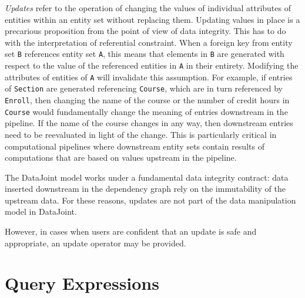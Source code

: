 \documentclass[letter,10pt]{article}
\newcommand{\datajoint}{DataJoint\xspace}
\begin{document}
\emph{Updates} refer to the operation of changing the values of individual attributes of entities within an entity set without replacing them.
Updating values in place is a precarious proposition from the point of view of data integrity. 
This has to do with the interpretation of referential constraint.  
When a foreign key from entity set \lstinline{B} references entity set \lstinline{A}, this means that elements in \lstinline{B} are generated with respect to the value of the referenced entities in \lstinline{A} in their entirety.  
Modifying the attributes of entities of \lstinline{A} will invalidate this assumption.
For example, if entries of \lstinline{Section} are generated referencing \lstinline{Course}, which are in turn referenced by \lstinline{Enroll}, then changing the name of the course or the number of credit hours in \lstinline{Course} would fundamentally change the meaning of entries downstream in the pipeline.  
If the name of the course changes in any way, then downstream entries need to be reevaluated in light of the change.
This is particularly critical in computational pipelines where downstream entity sets contain results of computations that are based on values upstream in the pipeline.  

The \datajoint model works under a fundamental data integrity contract: data inserted downstream in the dependency graph rely on the immutability of the upstream data. 
For these reasons, updates are not part of the data manipulation model in \datajoint.

However, in cases when users are confident that an update is safe and appropriate, an update operator may be provided.

\section{Query Expressions}\label{sec:query}
\end{document}
